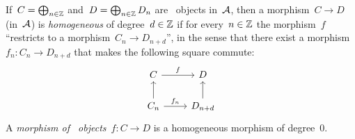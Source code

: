 \begin{remark}
\begin{enumerate}
      If~$C = \bigoplus_{n \in \mathbb{Z}}$ and~$D = \bigoplus_{n \in \mathbb{Z}} D_n$ are~ objects in~$\mathcal{A}$, then a morphism~$C \to D$ (in~$\mathcal{A}$) is \emph{homogeneous} of degree~$d \in \mathbb{Z}$ if for every~$n \in \mathbb{Z}$ the morphism~$f$ \enquote{restricts to a morphism~$C_n \to D_{n+d}$}, in the sense that there exist a morphism~$f_n \colon C_n \to D_{n+d}$ that makes the following square commute:
      \[
        \begin{tikzcd}
            C
            \arrow{r}[above]{f}
          & D
          \\
            C_n
            \arrow{u}
            \arrow{r}[above]{f_n}
          & D_{n+d}
            \arrow{u}
        \end{tikzcd}
      \]
      A \emph{morphism of~ objects}~$f \colon C \to D$ is a homogeneous morphism of degree~$0$.
      

\end{enumerate}
\end{remark}
